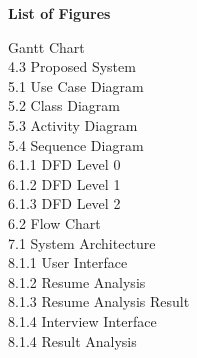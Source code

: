 \documentclass[12pt]{article}
\begin{document}
\setcounter{page}{3}   %


\begin{center}
    {\Large \bfseries List of Figures}
\end{center}

\vspace{1cm}

\hspace{0.3em}Gantt Chart  \\[6pt]
4.3\hspace{0.3em} Proposed System  \\[15pt]
5.1\hspace{0.3em} Use Case Diagram  \\[6pt]
5.2\hspace{0.3em} Class Diagram  \\[6pt]
5.3\hspace{0.3em} Activity Diagram  \\[6pt]
5.4\hspace{0.3em} Sequence Diagram  \\[15pt]
6.1.1\hspace{0.3em} DFD Level 0  \\[6pt]
6.1.2\hspace{0.3em} DFD Level 1  \\[6pt]
6.1.3\hspace{0.3em} DFD Level 2  \\[6pt]
6.2\hspace{0.3em} Flow Chart  \\[15pt]
7.1\hspace{0.3em} System Architecture  \\[15pt]
8.1.1\hspace{0.3em} User Interface  \\[6pt]
8.1.2\hspace{0.3em} Resume Analysis  \\[6pt]
8.1.3\hspace{0.3em} Resume Analysis Result \\[6pt]
8.1.4\hspace{0.3em} Interview Interface  \\[6pt]
8.1.4\hspace{0.3em} Result Analysis  \\[6pt]
\end{document}

